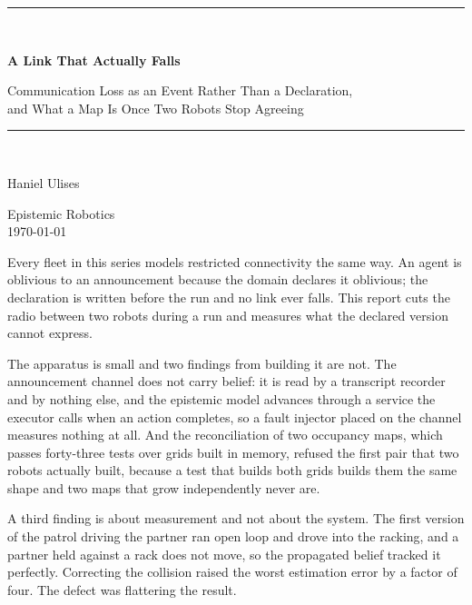 \documentclass[11pt,a4paper]{article}
\theoremstyle{definition}
\begin{document}
\begin{titlepage}
\centering
\vspace*{2.4cm}
{\color{rulegrey}\rule{\textwidth}{0.8pt}}\\[0.9cm]
{\LARGE\bfseries A Link That Actually Falls\par}
\vspace{0.5cm}
{\large\color{slate} Communication Loss as an Event Rather Than a Declaration,\\ and What a Map Is Once Two Robots Stop Agreeing\par}
\vspace{0.7cm}
{\color{rulegrey}\rule{\textwidth}{0.8pt}}\\[1.4cm]

{\large Haniel Ulises\par}
\vspace{0.3cm}
{\color{slate} Epistemic Robotics}\\
\vspace{0.15cm}
{\color{slate}\today}

\vfill
{\color{slate}\small
Every fleet in this series models restricted connectivity the same way. An
agent is oblivious to an announcement because the domain declares it oblivious;
the declaration is written before the run and no link ever falls. This report
cuts the radio between two robots during a run and measures what the declared
version cannot express.

\vspace{0.6em}
The apparatus is small and two findings from building it are not. The
announcement channel does not carry belief: it is read by a transcript recorder
and by nothing else, and the epistemic model advances through a service the
executor calls when an action completes, so a fault injector placed on the
channel measures nothing at all. And the reconciliation of two occupancy maps,
which passes forty-three tests over grids built in memory, refused the first
pair that two robots actually built, because a test that builds both grids
builds them the same shape and two maps that grow independently never are.

\vspace{0.6em}
A third finding is about measurement and not about the system. The first
version of the patrol driving the partner ran open loop and drove into the
racking, and a partner held against a rack does not move, so the propagated
belief tracked it perfectly. Correcting the collision raised the worst
estimation error by a factor of four. The defect was flattering the result.}
\vspace{1.2cm}
\end{titlepage}
\end{document}
